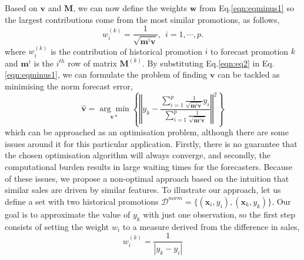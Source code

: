 \documentclass{ieeeaccess}
\begin{document}
Based on $\mathbf{v}$ and $\mathbf{M}$, we can now define the weights $\mathbf{w}$ from Eq.\eqref{eqn:eqminus1} so the largest contributions come from the most similar promotions, as follows,
%
\begin{equation}
w_i^{(k)} = \frac{1}{\sqrt{\mathbf{m}^i \mathbf{v}}} , ~~ i=1,\cdots,p.
\label{eqn:eq2}
\end{equation}
%
where $w_i^{(k)}$ is the contribution of historical promotion $i$ to forecast promotion $k$ and $\mathbf{m}^i$ is the $i^{th}$ row of matrix $\mathbf{M}^{(k)}$. By substituting Eq.\eqref{eqn:eq2} in Eq.\eqref{eqn:eqminus1}, we can formulate the problem of finding $\mathbf{v}$ can be tackled as minimising the norm forecast error,
%
\begin{equation}
\hat{\mathbf{v}}= \underset{\mathbf{v}*}{\arg\min} \left\{ \left\Vert y_k - \frac{ \sum_{i=1}^{p} \frac{1}{\sqrt{\mathbf{m}^i \mathbf{v}}} y_i} {\sum_{i=1}^{p} \frac{1}{\sqrt{\mathbf{m}^i \mathbf{v}}}}  \right\Vert^2 \right\}
\label{eqn:eq3}
\end{equation}
which can be approached as an optimisation problem, although there are some issues around it for this particular application. Firstly, there is no guarantee that the chosen optimisation algorithm will always converge, and secondly, the computational burden results in large waiting times for the forecasters. Because of these issues, we propose a non-optimal approach based on the intuition that similar sales are driven by similar features. To illustrate our approach, let us define a set with two historical promotions $\mathcal{D}^{norm} = \{(\mathbf{x}_i, y_i), (\mathbf{x}_k, y_k)\}$. Our goal is to approximate the value of $y_k$ with just one observation, so the first step consists of setting the weight $w_i$ to a measure derived from the difference in sales,
\begin{equation}
w_i^{(k)} = \frac{1}{|y_k - y_i|}
\label{eqn:eq4}
\end{equation}
\end{document}
